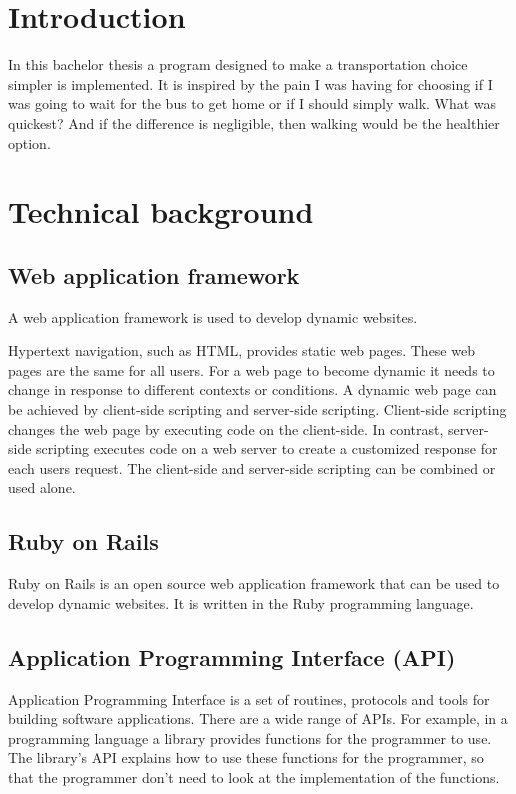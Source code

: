 \documentclass[10pt,a4paper]{article}
\begin{document}
\section{Introduction}
In this bachelor thesis a program designed to make a transportation choice simpler is implemented. It is inspired by the pain I was having for choosing if I was going to wait for the bus to get home or if I should simply walk. What was quickest? And if the difference is negligible, then walking would be the healthier option.
\section{Technical background}
\subsection{Web application framework}
A web application framework is used to develop dynamic websites. 

Hypertext navigation, such as HTML, provides static web pages. These web pages are the same for all users. For a web page to become dynamic it needs to change in response to different contexts or conditions. A dynamic web page can be achieved by client-side scripting and server-side scripting. Client-side scripting changes the web page by executing code on the client-side. In contrast, server-side scripting executes code on a web server to create a customized response for each users request. The client-side and server-side scripting can be combined or used alone.

\subsection{Ruby on Rails}
Ruby on Rails is an open source web application framework that can be used to develop dynamic websites. It is written in the Ruby programming language. 

\subsection{Application Programming Interface (API)}
Application Programming Interface is a set of routines, protocols and tools for building software applications. There are a wide range of APIs. For example, in a programming language a library provides functions for the programmer to use. The library's API explains how to use these functions for the programmer, so that the programmer don't need to look at the implementation of the functions.
\end{document}
